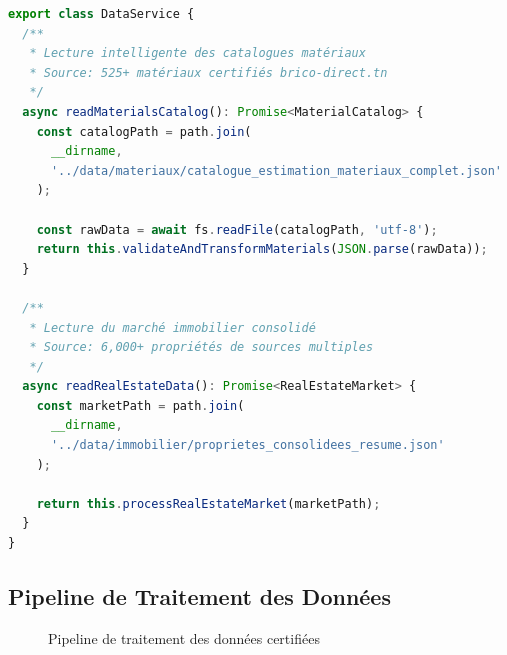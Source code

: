 \begin{lstlisting}[language=TypeScript, caption=Service de lecture des données JSON]
export class DataService {
  /**
   * Lecture intelligente des catalogues matériaux
   * Source: 525+ matériaux certifiés brico-direct.tn
   */
  async readMaterialsCatalog(): Promise<MaterialCatalog> {
    const catalogPath = path.join(
      __dirname, 
      '../data/materiaux/catalogue_estimation_materiaux_complet.json'
    );
    
    const rawData = await fs.readFile(catalogPath, 'utf-8');
    return this.validateAndTransformMaterials(JSON.parse(rawData));
  }

  /**
   * Lecture du marché immobilier consolidé
   * Source: 6,000+ propriétés de sources multiples
   */
  async readRealEstateData(): Promise<RealEstateMarket> {
    const marketPath = path.join(
      __dirname,
      '../data/immobilier/proprietes_consolidees_resume.json'
    );
    
    return this.processRealEstateMarket(marketPath);
  }
}
\end{lstlisting}

\subsection{Pipeline de Traitement des Données}

\begin{figure}[H]
\centering
{}
\caption{Pipeline de traitement des données certifiées}
\label{fig:pipeline_donnees}
\end{figure}


